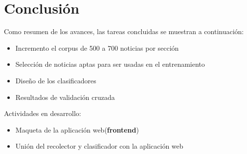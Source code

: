 \section{Conclusión}

Como resumen de los avances, las tareas concluidas se muestran a continuación:

\begin{itemize}
	\item Incremento el corpus de 500 a 700 noticias por sección
	\item Selección de noticias aptas para ser usadas en el entrenamiento
	\item Diseño de los clasificadores		
	\item Resultados de validación cruzada
\end{itemize}

Actividades en desarrollo:

\begin{itemize}
	\item Maqueta de la aplicación web(\textbf{frontend})
	\item Unión del recolector y clasificador con la aplicación web
\end{itemize}

